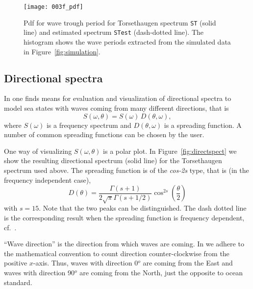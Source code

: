 \begin{figure}[tbh]
\centering
\texttt{[image: 003f\_pdf]}
\vspace{-3mm}
\caption[Wave period, $T_{t}$, distribution]{
Pdf for wave  trough period for Torsethaugen spectrum {\tt ST} (solid line)
and estimated spectrum {\tt STest} (dash-dotted line).
The histogram shows the wave periods extracted from
the simulated data in Figure~\ref{fig:simulation}.}
\label{fig:pdf}
\end{figure}

\subsection{Directional spectra}\label{ss:dirspec}
In \progname{} one finds means for evaluation and visualization of
directional spectra to model sea states with
waves coming from many different directions, that is
\[
   S(\omega,\theta)=S(\omega)\, D(\theta,\omega), \]
where $S(\omega)$ is a
frequency spectrum and $D(\theta,\omega)$ is a spreading function. A
number of common spreading functions can be chosen by the user.

One way of visualizing $S(\omega,\theta)$ is a polar plot. In
Figure~\ref{fig:directspect} we show the resulting directional spectrum
(solid line) for the Torsethaugen
spectrum  
used above. The spreading 
function is of the \emph{cos-2s} type, that is (in the frequency
independent case),
\[
   D(\theta)=\frac{\Gamma(s+1)}{2\sqrt{\pi}\Gamma(s+1/2)}\cos^{2s}
    \left( \frac{\theta}{2} \right) \]
with $s\!\!=\!\!15$. Note that
the two peaks can be dis\-tinguished. The dash dotted line is the
corresponding result when the spreading function is frequency
dependent, cf.~\cite{KrogstadAndBarstow1999Directional}.

\begin{remark}``Wave direction''  is the direction from which waves are coming. 
In \wf{} we adhere to the mathematical convention to count direction counter-clockwise 
from the positive $x$-axis. Thus, waves with direction 0$^o$ are coming from the East and 
waves with direction 90$^o$ are coming from the North, just the opposite to ocean standard. 
\end{remark}

